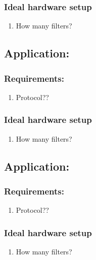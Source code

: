 \subsubsection{Ideal hardware setup}
\begin{enumerate}
    \item How many filters?
\end{enumerate}




\subsection{Application: }

\subsubsection{Requirements:}
\begin{enumerate}
    \item Protocol??
\end{enumerate}

\subsubsection{Ideal hardware setup}
\begin{enumerate}
    \item How many filters?
\end{enumerate}



\subsection{Application: }

\subsubsection{Requirements:}
\begin{enumerate}
    \item Protocol??
\end{enumerate}

\subsubsection{Ideal hardware setup}
\begin{enumerate}
    \item How many filters?
\end{enumerate}





